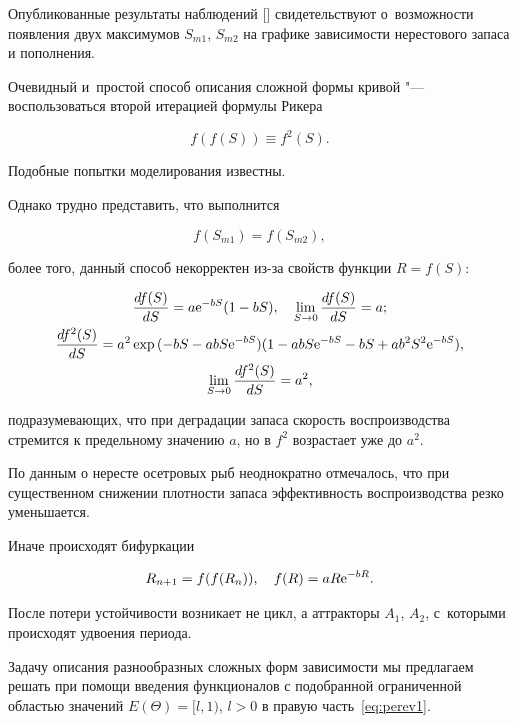 Опубликованные результаты наблюдений [] свидетельствуют о~возможности появления двух максимумов $S_{m1}$, $S_{m2}$ на графике зависимости нерестового запаса и пополнения. 

Очевидный и~простой способ описания сложной формы кривой "--- воспользоваться второй итерацией формулы Рикера 

$$f(f(S))\equiv f^2(S).$$ 

Подобные попытки моделирования известны. 

Однако трудно представить, что выполнится 

$$f(S_{m1})=f(S_{m2}),$$

более того, данный способ некорректен из-за свойств функции $R=f(S)$:

\begin{gather*}

\frac{df(S)}{dS}=a{\rm e}^{-bS}(1-bS), \quad  \lim_{S\rightarrow 0}{\frac{df(S)}{dS}}=a; 

\\

\frac{df^2(S)}{dS}= a^2\exp{(-bS-abS{\rm e}^{-bS})}(1-abS{\rm e}^{-bS}-bS+ab^2S^2{\rm e}^{-bS}), \\

\lim_{S\rightarrow 0}{\frac{df^2(S)}{dS}}=a^2,

\end{gather*}

подразумевающих, что при деградации запаса скорость воспроизводства стремится к предельному значению $a$, но в $f^2$ возрастает уже до $a^2.$



По данным о нересте осетровых рыб неоднократно отмечалось, что при существенном снижении плотности запаса эффективность воспроизводства резко уменьшается. 

Иначе происходят бифуркации 

$$R_{n+1}=f(f(R_n)), \quad  f(R)=aR{\rm e}^{-bR}.$$ 

После потери устойчивости возникает не цикл, а аттракторы $A_1$, $A_2$, с~которыми происходят удвоения периода. 

Задачу описания разнообразных сложных форм зависимости мы предлагаем решать при помощи введения функционалов с подобранной ограниченной областью значений $E(\Theta )=[l, 1)$, $l>0$ в правую часть~\eqref{eq:perev1}.











